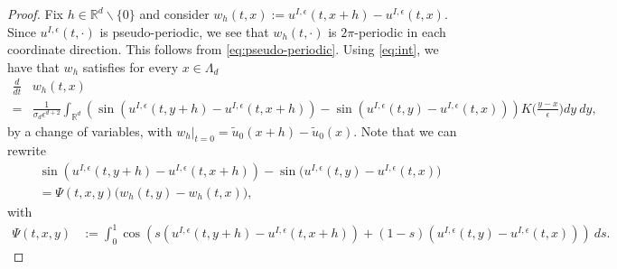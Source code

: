 \documentclass[a4paper,11pt]{amsart}
\newcommand{\red}[1]{{#1}}
\newcommand{\R}{\mathbb{R}}
\newcommand{\ep}{\epsilon}
\numberwithin{equation}{section}
\numberwithin{theorem}{section}
\theoremstyle{definition}
\begin{document}
\begin{proof}

Fix $h\in\R^d\backslash\{0\}$ and consider $w_h(t,x):=u^{I,\ep}(t,x+h)-u^{I,\ep}(t,x)$. \red{Since $u^{I,\ep}(t,\cdot)$ is pseudo-periodic, we see that $w_h(t,\cdot)$ is $2\pi$-periodic in each coordinate direction. This follows from \eqref{eq:pseudo-periodic}.} Using \eqref{eq:int}, we have that $w_h$ satisfies for every $x\in\Lambda_d$
\begin{align*}
\frac{d}{dt}&w_h(t,x)\\
=&\displaystyle\frac{1}{\sigma_d\ep^{d+2}}\int_{\R^d}\left(\sin\left(u^{I,\ep}(t,y+h)-u^{I,\ep}(t,x+h)\right)-\sin\left(u^{I,\ep}(t,y)-u^{I,\ep}(t,x)\right)\right)K\Big(\frac{y-x}{\ep}\Big)dy \:dy,
\end{align*}
by a change of variables, with $ w_h|_{t=0}=\tilde u_0(x+h)-\tilde u_0(x)$.
Note that we can rewrite
\begin{align*}
&\sin\left(u^{I,\ep}(t,y+h)-u^{I,\ep}(t,x+h)\right)-\sin\big(u^{I,\ep}(t,y)-u^{I,\ep}(t,x)\big)\\
&=\Psi(t, x,y)\big(w_h(t,y)-w_h(t,x)\big),
\end{align*}
with
\begin{align*}
\Psi(t, x, y)&:=\int_0^1\cos\left(s(u^{I,\ep}(t,y+h)-u^{I,\ep}(t,x+h))+(1-s)(u^{I,\ep}(t,y)-u^{I,\ep}(t,x))\right)\:ds.
\end{align*}



\end{proof}
\end{document}
